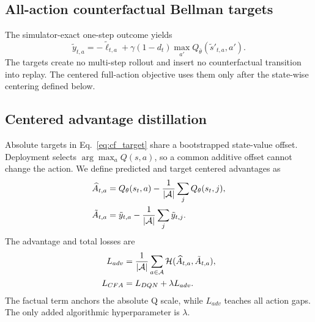 \documentclass[11pt]{article}
\begin{document}
\subsection{All-action counterfactual Bellman targets}

The simulator-exact one-step outcome yields
\begin{equation}
\tilde y_{t,a}=-\tilde \ell_{t,a}+\gamma(1-d_t)
\max_{a'}Q_{\bar\theta}(\tilde s'_{t,a},a').
\label{eq:cf_target}
\end{equation}
The targets create no multi-step rollout and insert no counterfactual transition into replay. The centered full-action objective uses them only after the state-wise centering defined below.

\subsection{Centered advantage distillation}

Absolute targets in Eq.~\eqref{eq:cf_target} share a bootstrapped state-value offset. Deployment selects $\arg\max_a Q(s,a)$, so a common additive offset cannot change the action. We define predicted and target centered advantages as
\begin{align}
\widehat A_{t,a}&=Q_\theta(s_t,a)-\frac{1}{|\mathcal A|}\sum_jQ_\theta(s_t,j),\notag\\
\tilde A_{t,a}&=\tilde y_{t,a}-\frac{1}{|\mathcal A|}\sum_j\tilde y_{t,j}.
\label{eq:center}
\end{align}
The advantage and total losses are
\begin{align}
L_{adv}&=\frac{1}{|\mathcal A|}
\sum_{a\in\mathcal A}\mathcal H(\widehat A_{t,a},\tilde A_{t,a}),\notag\\
L_{CFA}&=L_{DQN}+\lambda L_{adv}.
\label{eq:cbad}
\end{align}
The factual term anchors the absolute Q scale, while $L_{adv}$ teaches all action gaps. The only added algorithmic hyperparameter is $\lambda$.
\end{document}
